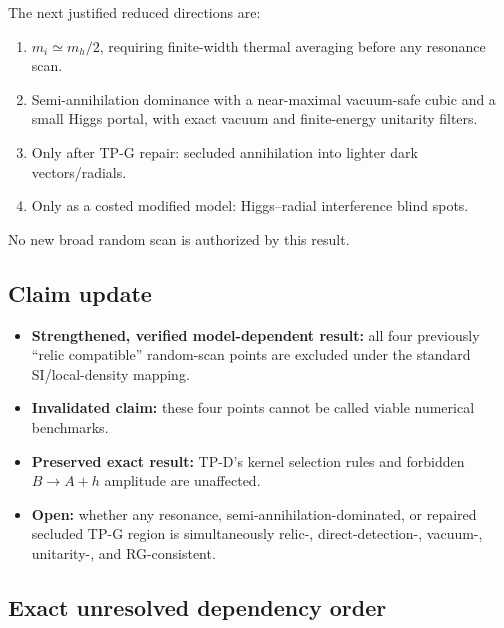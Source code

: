 \documentclass[
]{article}
\providecommand{\tightlist}{%
  \setlength{\itemsep}{0pt}\setlength{\parskip}{0pt}}
\begin{document}
The next justified reduced directions are:

\begin{enumerate}
\def\labelenumi{\arabic{enumi}.}
\tightlist
\item
  \(m_i\simeq m_h/2\), requiring finite-width thermal averaging before
  any resonance scan.
\item
  Semi-annihilation dominance with a near-maximal vacuum-safe cubic and
  a small Higgs portal, with exact vacuum and finite-energy unitarity
  filters.
\item
  Only after TP-G repair: secluded annihilation into lighter dark
  vectors/radials.
\item
  Only as a costed modified model: Higgs--radial interference blind
  spots.
\end{enumerate}

No new broad random scan is authorized by this result.

\hypertarget{claim-update}{%
\subsection{Claim update}\label{claim-update}}

\begin{itemize}
\tightlist
\item
  \textbf{Strengthened, verified model-dependent result:} all four
  previously ``relic compatible'' random-scan points are excluded under
  the standard SI/local-density mapping.
\item
  \textbf{Invalidated claim:} these four points cannot be called viable
  numerical benchmarks.
\item
  \textbf{Preserved exact result:} TP-D's kernel selection rules and
  forbidden \(B\to A+h\) amplitude are unaffected.
\item
  \textbf{Open:} whether any resonance, semi-annihilation-dominated, or
  repaired secluded TP-G region is simultaneously relic-,
  direct-detection-, vacuum-, unitarity-, and RG-consistent.
\end{itemize}

\hypertarget{exact-unresolved-dependency-order}{%
\subsection{Exact unresolved dependency
order}\label{exact-unresolved-dependency-order}}
\end{document}
